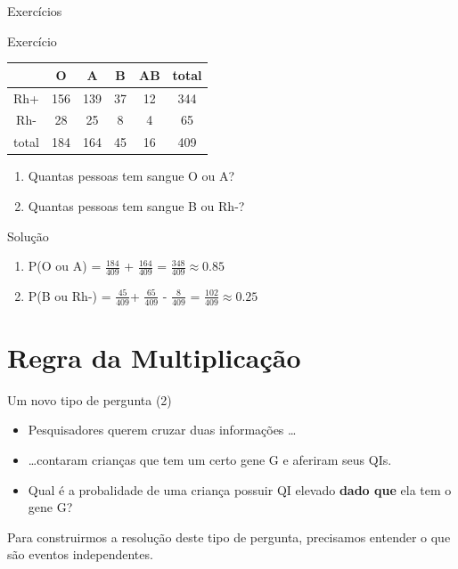 \documentclass{beamer}
\begin{document}
\begin{frame}{Exercícios}
  \begin{block}{Exercício}
    \begin{tabular}{ccccc|c}
      & O & A & B & AB & total\\
      \hline
      Rh+ & 156 & 139 & 37 & 12 & 344\\
      Rh- & 28 & 25 & 8 & 4 & 65\\
      \hline
      total & 184 & 164 & 45 & 16 & 409\\
    \end{tabular}
    \begin{enumerate}
    \item<1-> Quantas pessoas tem sangue O ou A?
    \item<1-> Quantas pessoas tem sangue B ou Rh-?
    \end{enumerate}
  \end{block}
  \begin{block}{Solução}
    \begin{enumerate}
    \item P(O ou A) = $\frac{184}{409}$ + $\frac{164}{409}$ =
      $\frac{348}{409} \approx 0.85$
    \item P(B ou Rh-) = $\frac{45}{409}$+ $\frac{65}{409}$ -
      $\frac{8}{409}$ = $\frac{102}{409} \approx 0.25$
    \end{enumerate}
  \end{block}
\end{frame}

\section{Regra da Multiplicação}


\begin{frame}{Um novo tipo de pergunta (2)}
  \begin{example}
    \begin{itemize}
    \item Pesquisadores querem cruzar duas informações \ldots
    \item \ldots contaram crianças que tem um certo gene G e aferiram seus
      QIs.
    \item Qual é a probalidade de uma criança possuir QI elevado
      \alert{{\bf dado que}} ela tem o gene G?
    \end{itemize}
  \end{example}

  Para construirmos a resolução deste tipo de pergunta, precisamos entender o que são eventos independentes.
\end{frame}
\end{document}
